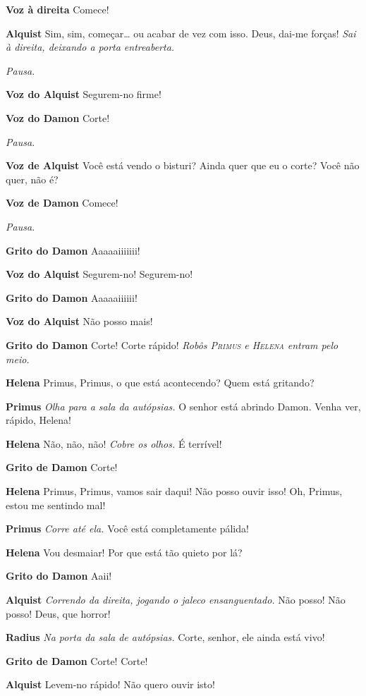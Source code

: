 \textbf{Voz à direita} Comece!

\textbf{Alquist} Sim, sim, começar\ldots{} ou acabar de vez com isso. Deus, dai-me forças! \emph{Sai à
direita, deixando a porta entreaberta.}

\emph{Pausa.}

\textbf{Voz do Alquist} Segurem-no firme!

\textbf{Voz do Damon} Corte!

\emph{Pausa.}

\textbf{Voz de Alquist} Você está vendo o bisturi? Ainda quer que eu o corte? Você não
quer, não é?

\textbf{Voz de Damon} Comece!

\emph{Pausa.}

\textbf{Grito do Damon} Aaaaaiiiiiii!

\textbf{Voz do Alquist} Segurem-no! Segurem-no!

\textbf{Grito do Damon} Aaaaaiiiiii!

\textbf{Voz do Alquist} Não posso mais!

\textbf{Grito do Damon} Corte! Corte rápido!
\emph{Robôs \textsc{Primus} e \textsc{Helena} entram pelo meio.}

\textbf{Helena} Primus, Primus, o que está acontecendo? Quem está gritando?

\textbf{Primus} \emph{Olha para a sala da autópsias.} O senhor está abrindo Damon.
Venha ver, rápido, Helena!

\textbf{Helena} Não, não, não! \emph{Cobre os olhos.} É terrível!

\textbf{Grito de Damon} Corte!

\textbf{Helena} Primus, Primus, vamos sair daqui! Não posso ouvir isso! Oh, Primus,
estou me sentindo mal!

\textbf{Primus} \emph{Corre até ela.} Você está completamente pálida!

\textbf{Helena} Vou desmaiar! Por que está tão quieto por lá?

\textbf{Grito do Damon} Aaii!

\textbf{Alquist} \emph{Correndo da direita, jogando o jaleco ensanguentado.} Não
posso! Não posso! Deus, que horror!

\textbf{Radius} \emph{Na porta da sala de autópsias.} Corte, senhor, ele ainda está
vivo!

\textbf{Grito de Damon} Corte! Corte!

\textbf{Alquist} Levem-no rápido! Não quero ouvir isto!

